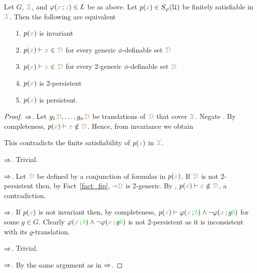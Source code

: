 \begin{theorem}\label{thm_generic_invariant}
  Let $G$, ${\color{brown}\EuScript X}$, and $\varphi({\color{brown} x}\,;{\color{green} z})\in L$ be as above.
  Let $p({\color{brown} x})\in S_\varphi(\EuScript U)$ be finitely satisfiable in ${\color{brown}\EuScript X}$.
  Then the following are equivalent
  \begin{itemize}
    \item[1.] $p({\color{brown} x})$ is invariant
    \item[2.] $p({\color{brown} x})\vdash{\color{brown}x}\in{\color{brown}\EuScript D}$ for every generic $\phi$-definable set ${\color{brown}\EuScript D}$
    \item[3.] $p({\color{brown} x})\vdash{\color{brown}x}\in{\color{brown}\EuScript D}$ for every 2-generic $\phi$-definable set ${\color{brown}\EuScript D}$
    \item[4.] $p({\color{brown} x})$ is 2-persistent
    \item[5.] $p({\color{brown} x})$ is persistent.
  \end{itemize}
\end{theorem}

\begin{proof}
  $\Rightarrow$.
  Let $g_1{\color{brown}\EuScript D},\dots,g_n{\color{brown}\EuScript D}$ be translations of ${\color{brown}\EuScript D}$ that cover ${\color{brown}\EuScript X}$.
  Negate .
  By completeness, $p({\color{brown} x})\vdash {\color{brown}x}\notin{\color{brown}\EuScript D}$.
  Hence, from invariance we obtain


  This contradicts the finite satisfiability of $p({\color{brown} x})$ in ${\color{brown}\EuScript X}$.

  $\Rightarrow$.
  Trivial.
  
  $\Rightarrow$.
  Let ${\color{brown}\EuScript D}$ be defined by a conjunction of formulas in $p({\color{brown} x})$.
  If ${\color{brown}\EuScript D}$ is not 2-persistent then, by Fact~\ref{fact_fip}, $\neg{\color{brown}\EuScript D}$ is 2-generic. 
  By , $p({\color{brown} x})\vdash{\color{brown}x}\notin{\color{brown}\EuScript D}$, a contradiction.

  $\Rightarrow$.
  If $p({\color{brown} x})$ is not invariant then, by completeness, $p({\color{brown} x})\vdash\varphi({\color{brown} x}\,;{\color{green} b})\wedge\neg\varphi({\color{brown} x}\,;g{\color{green} b})$ for some $g\in G$.
  Clearly $\varphi({\color{brown} x}\,;{\color{green} b})\wedge\neg\varphi({\color{brown} x}\,;g{\color{green} b})$ is not 2-persistent as it is inconsistent with its $g$-translation.

  $\Rightarrow$.
  Trivial.

  $\Rightarrow$.
  By the same argument as in $\Rightarrow$.
\end{proof}

